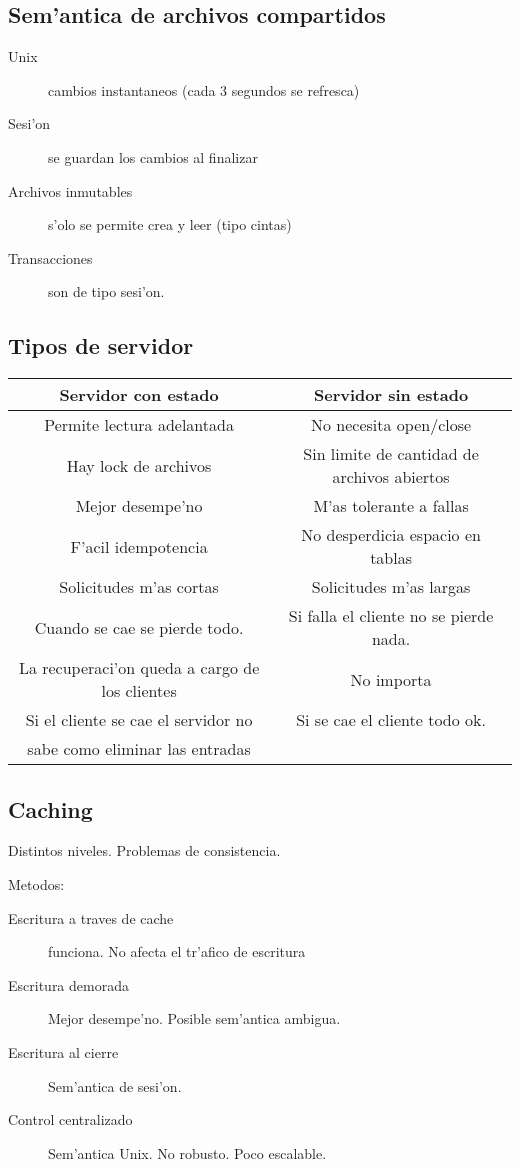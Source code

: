 \documentclass[a4paper,spanish]{article}
\begin{document}
\subsection{Sem'antica de archivos compartidos}
\begin{description}
	\item[Unix] cambios instantaneos (cada 3 segundos se refresca)
	\item[Sesi'on] se guardan los cambios al finalizar
	\item[Archivos inmutables] s'olo se permite crea y leer (tipo cintas)
	\item[Transacciones] son de tipo sesi'on.
\end{description}

\subsection{Tipos de servidor}
\begin{tabular}{|c|c|}
\hline
Servidor con estado		& Servidor sin estado \\ \hline
Permite lectura adelantada	& No necesita open/close \\ \hline
Hay lock de archivos		& Sin limite de cantidad de archivos abiertos
\\ \hline
Mejor desempe'no		& M'as tolerante a fallas \\ \hline
F'acil idempotencia		& No desperdicia espacio en tablas \\ \hline
Solicitudes m'as cortas		& Solicitudes m'as largas \\ \hline
Cuando se cae se pierde todo. & Si falla el cliente no se pierde nada. \\
La recuperaci'on queda a cargo de los clientes & No importa \\ \hline
Si el cliente se cae el servidor no & Si se cae
el cliente todo ok. \\
sabe como eliminar las entradas & \\
\hline
\end{tabular}

\subsection{Caching}
Distintos niveles. Problemas de consistencia.

Metodos:
\begin{description}
	\item[Escritura a traves de cache] funciona. No afecta el tr'afico de
escritura
	\item[Escritura demorada] Mejor desempe'no. Posible sem'antica ambigua.
	\item[Escritura al cierre] Sem'antica de sesi'on.
	\item[Control centralizado] Sem'antica Unix. No robusto. Poco
escalable.
\end{description}
\end{document}
